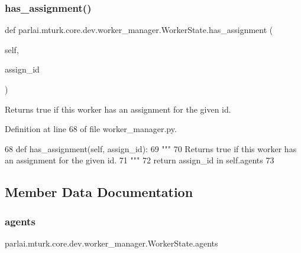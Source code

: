 \subsubsection{\texorpdfstring{has\+\_\+assignment()}{has\_assignment()}}
{\footnotesize\ttfamily def parlai.\+mturk.\+core.\+dev.\+worker\+\_\+manager.\+Worker\+State.\+has\+\_\+assignment (\begin{DoxyParamCaption}\item[{}]{self,  }\item[{}]{assign\+\_\+id }\end{DoxyParamCaption})}

\begin{DoxyVerb}Returns true if this worker has an assignment for the given id.
\end{DoxyVerb}
 

Definition at line 68 of file worker\+\_\+manager.\+py.


\begin{DoxyCode}
68     \textcolor{keyword}{def }has\_assignment(self, assign\_id):
69         \textcolor{stringliteral}{"""}
70 \textcolor{stringliteral}{        Returns true if this worker has an assignment for the given id.}
71 \textcolor{stringliteral}{        """}
72         \textcolor{keywordflow}{return} assign\_id \textcolor{keywordflow}{in} self.agents
73 
\end{DoxyCode}


\subsection{Member Data Documentation}
\mbox{\label{classparlai_1_1mturk_1_1core_1_1dev_1_1worker__manager_1_1WorkerState_ae267b0c320d73f92f96dd347bb9265cb}} 
\subsubsection{\texorpdfstring{agents}{agents}}
{\footnotesize\ttfamily parlai.\+mturk.\+core.\+dev.\+worker\+\_\+manager.\+Worker\+State.\+agents}



